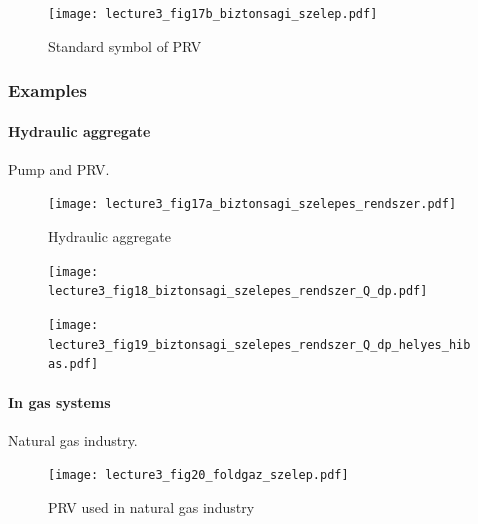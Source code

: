 \begin{figure}[tbh]
\begin{center}
\texttt{[image: lecture3\_fig17b\_biztonsagi\_szelep.pdf]}
\caption{\label{fig:PRV}Standard symbol of PRV}
\end{center}
\end{figure}

\subsubsection{Examples}
\paragraph{Hydraulic aggregate}
Pump and PRV.
\begin{figure}[tbh]
\begin{center}
\texttt{[image: lecture3\_fig17a\_biztonsagi\_szelepes\_rendszer.pdf]}
\caption{\label{fig:hydraulic_aggregate}Hydraulic aggregate}
\end{center}
\end{figure}
\begin{figure}[tbh]
\begin{center}
\texttt{[image: lecture3\_fig18\_biztonsagi\_szelepes\_rendszer\_Q\_dp.pdf]}
\caption{\label{fig:?}}
\end{center}
\end{figure}\begin{figure}[tbh]
\begin{center}
\texttt{[image: lecture3\_fig19\_biztonsagi\_szelepes\_rendszer\_Q\_dp\_helyes\_hibas.pdf]}
\caption{\label{fig:??}}
\end{center}
\end{figure}
\paragraph{In gas systems}
Natural gas industry.
\begin{figure}[tbh]
\begin{center}
\texttt{[image: lecture3\_fig20\_foldgaz\_szelep.pdf]}
\caption{\label{fig:PRV_gas_industry}PRV used in natural gas industry}
\end{center}
\end{figure}


\clearpage

